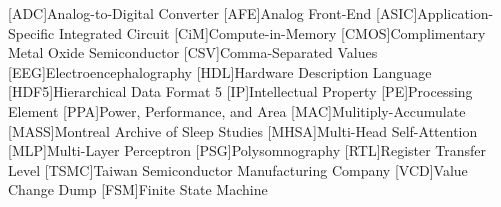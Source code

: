 \begin{acronym}
    {\small{}
    [ADC]{Analog-to-Digital Converter}
    [AFE]{Analog Front-End}
    [ASIC]{Application-Specific Integrated Circuit}
    [CiM]{Compute-in-Memory}
    [CMOS]{Complimentary Metal Oxide Semiconductor}
    [CSV]{Comma-Separated Values}
    [EEG]{Electroencephalography}
    [HDL]{Hardware Description Language}
    [HDF5]{Hierarchical Data Format 5}
    [IP]{Intellectual Property}
    [PE]{Processing Element}
    [PPA]{Power, Performance, and Area}
    [MAC]{Mulitiply-Accumulate}
    [MASS]{Montreal Archive of Sleep Studies}
    [MHSA]{Multi-Head Self-Attention}
    [MLP]{Multi-Layer Perceptron}
    [PSG]{Polysomnography}
    [RTL]{Register Transfer Level}
    [TSMC]{Taiwan Semiconductor Manufacturing Company}
    [VCD]{Value Change Dump}
    [FSM]{Finite State Machine}
    }
\end{acronym}